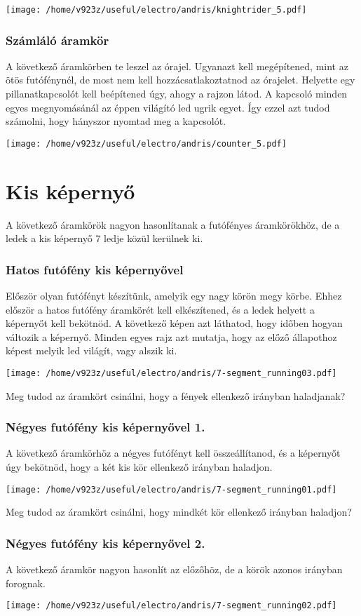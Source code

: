 \documentclass[16pt]{scrreprt}
\begin{document}
\texttt{[image: /home/v923z/useful/electro/andris/knightrider\_5.pdf]}

\subsubsection{Számláló áramkör}

A következő áramkörben te leszel az órajel. Ugyanazt kell megépítened, mint az ötös futófénynél, de most nem kell
hozzá\-csatlakoztatnod az órajelet. Helyette egy pillanatkapcsolót kell beépítened úgy, ahogy a rajzon látod. A kapcsoló
minden egyes megnyomásánál az éppen világító led ugrik egyet. Így ezzel azt tudod számolni, hogy hányszor nyomtad meg a
kapcsolót.

\texttt{[image: /home/v923z/useful/electro/andris/counter\_5.pdf]}

\section{Kis képernyő}

A következő áramkörök nagyon hasonlítanak a futófényes áramkörökhöz, de a ledek a kis képernyő 7 ledje közül kerülnek 
ki. 

\subsubsection{Hatos futófény kis képernyővel}

Először olyan futófényt készítünk, amelyik egy nagy körön megy körbe. Ehhez először a hatos futófény áramkörét kell 
elkészítened, és a ledek helyett a képernyőt kell bekötnöd. A következő képen azt láthatod, hogy időben hogyan változik 
a képernyő. Minden egyes rajz azt mutatja, hogy az előző állapothoz képest melyik led világít, vagy alszik ki. 

\texttt{[image: /home/v923z/useful/electro/andris/7-segment\_running03.pdf]}

Meg tudod az áramkört csinálni, hogy a fények ellenkező irányban haladjanak?

\subsubsection{Négyes futófény kis képernyővel 1.}

A következő áramkörhöz a négyes futófényt kell összeállítanod, és a képernyőt úgy bekötnöd, hogy a két kis kör 
ellenkező irányban haladjon. 

\texttt{[image: /home/v923z/useful/electro/andris/7-segment\_running01.pdf]}

Meg tudod az áramkört csinálni, hogy mindkét kör ellenkező irányban haladjon?

\subsubsection{Négyes futófény kis képernyővel 2.}

A következő áramkör nagyon hasonlít az előzőhöz, de a körök azonos irányban forognak.

\texttt{[image: /home/v923z/useful/electro/andris/7-segment\_running02.pdf]}
\end{document}
